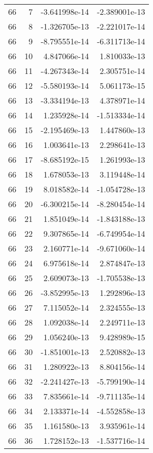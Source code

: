 \begin{tabular}{rrrr}
  66 &    7 & -3.641998e-14 & -2.389001e-13 \\
  66 &    8 & -1.326705e-13 & -2.221017e-14 \\
  66 &    9 & -8.795551e-14 & -6.311713e-14 \\
  66 &   10 &  4.847066e-14 &  1.810033e-13 \\
  66 &   11 & -4.267343e-14 &  2.305751e-14 \\
  66 &   12 & -5.580193e-14 &  5.061173e-15 \\
  66 &   13 & -3.334194e-13 &  4.378971e-14 \\
  66 &   14 &  1.235928e-14 & -1.513334e-14 \\
  66 &   15 & -2.195469e-13 &  1.447860e-13 \\
  66 &   16 &  1.003641e-13 &  2.298641e-13 \\
  66 &   17 & -8.685192e-15 &  1.261993e-13 \\
  66 &   18 &  1.678053e-13 &  3.119448e-14 \\
  66 &   19 &  8.018582e-14 & -1.054728e-13 \\
  66 &   20 & -6.300215e-14 & -8.280454e-14 \\
  66 &   21 &  1.851049e-14 & -1.843188e-13 \\
  66 &   22 &  9.307865e-14 & -6.749954e-14 \\
  66 &   23 &  2.160771e-14 & -9.671060e-14 \\
  66 &   24 &  6.975618e-14 &  2.874847e-13 \\
  66 &   25 &  2.609073e-13 & -1.705538e-13 \\
  66 &   26 & -3.852995e-13 &  1.292896e-13 \\
  66 &   27 &  7.115052e-14 &  2.324555e-13 \\
  66 &   28 &  1.092038e-14 &  2.249711e-13 \\
  66 &   29 &  1.056240e-13 &  9.428989e-15 \\
  66 &   30 & -1.851001e-13 &  2.520882e-13 \\
  66 &   31 &  1.280922e-13 &  8.804156e-14 \\
  66 &   32 & -2.241427e-13 & -5.799190e-14 \\
  66 &   33 &  7.835661e-14 & -9.711135e-14 \\
  66 &   34 &  2.133371e-14 & -4.552858e-13 \\
  66 &   35 &  1.161580e-13 &  3.935961e-14 \\
  66 &   36 &  1.728152e-13 & -1.537716e-14 \\

\end{tabular}
